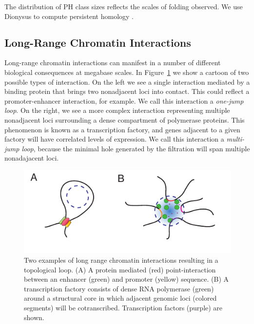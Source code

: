 The distribution of PH class sizes reflects the scales of folding observed.
We use Dionysus to compute persistent homology \cite{Morozov:2012}.

\subsection{Long-Range Chromatin Interactions}
%
Long-range chromatin interactions can manifest in a number of different biological consequences at megabase scales.
In Figure~\ref{fig:chromatin_interactions} we show a cartoon of two possible types of interaction.
On the left we see a single interaction mediated by a binding protein that brings two nonadjacent loci into contact.
This could reflect a promoter-enhancer interaction, for example.
We call this interaction a \emph{one-jump loop}.
On the right, we see a more complex interaction representing multiple nonadjacent loci surrounding a dense compartment of polymerase proteins.
This phenomenon is known as a transcription factory, and genes adjacent to a given factory will have correlated levels of expression.
We call this interaction a \emph{multi-jump loop}, because the minimal hole generated by the filtration will span multiple nonadajacent loci.

\begin{figure}
       \centering
       \includegraphics[width=\columnwidth]{./fig/hic/chromatin_interactions.pdf}
       \caption[Examples of Long-Range Chromatin Interactions]{Two examples of long range chromatin interactions resulting in a topological loop. (A) A protein mediated (red) point-interaction between an enhancer (green) and promoter (yellow) sequence. (B) A transcription factory consists of dense RNA polymerase (green) around a structural core in which adjacent genomic loci (colored segments) will be cotranscribed. Transcription factors (purple) are shown.}
       \label{fig:chromatin_interactions}
\end{figure}

